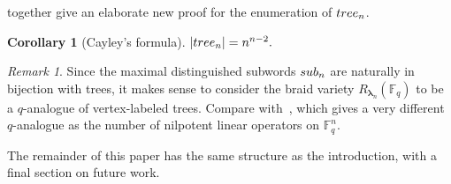 \documentclass[a4paper,10pt,leqno]{amsart}
\numberwithin{equation}{section}
\newtheorem{corollary}[theorem]{Corollary}
\theoremstyle{definition}
\theoremstyle{remark}
\newtheorem{remark}[theorem]{Remark}
\newcommand{\T}{\textsc{tree}}
\newcommand{\Ft}{\textsc{f}\widetilde{\textsc{a}}\textsc{ct}}
\renewcommand{\S}{\textsc{sub}}
\newcommand{\E}{\T}
\newcommand{\FF}{\mathbb{F}}
\newcommand{\blambda}{\bm{\lambda}}
\begin{document}
 together give an elaborate new proof for the enumeration of $\T_n$.

{
\renewcommand{\thecorollary}{\ref{cor:cayley}}
\begin{corollary}[Cayley's formula]
$|\E_n|=n^{n-2}.$
\end{corollary}
\addtocounter{theorem}{-1}
}

\begin{remark}
Since the maximal distinguished subwords $\S_n$ are naturally in bijection with trees, it makes sense to consider the braid variety $R_{\blambda_n}(\FF_q)$ to be a $q$-analogue of vertex-labeled trees.  Compare with~\cite{leinster2021probability}, which gives a very different $q$-analogue as the number of nilpotent linear operators on $\FF_q^n$.
\end{remark}

The remainder of this paper has the same structure as the introduction, with a final section on future work.

\end{document}
